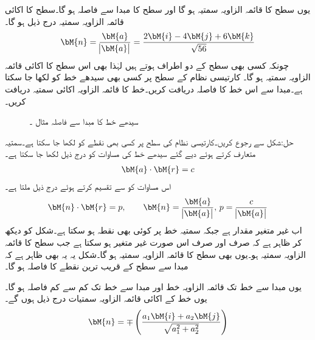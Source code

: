 یوں سطح  کا قائمہ الزاویہ سمتیہ  ہو گا اور سطح کا مبدا سے فاصلہ
  ہو گا۔سطح کا اکائی قائمہ الزاویہ سمتیہ درج ذیل ہو گا۔
\begin{align*}
\bM{n}=\frac{\bM{a}}{\abs{\bM{a}}}=\frac{2\bM{i}-4\bM{j}+6\bM{k}}{\sqrt{56}}
\end{align*}
چونکہ کسی بھی سطح کے دو اطراف ہوتے ہیں لہٰذا  بھی اس سطح کا اکائی قائمہ الزاویہ سمتیہ ہو گا۔
کارتیسی نظام کے  سطح پر کسی بھی سیدھے خط  کو  لکھا جا سکتا ہے۔مبدا سے اس خط کا فاصلہ دریافت کریں۔خط کا قائمہ الزاویہ اکائی سمتیہ دریافت کریں۔
\begin{figure}
\centering
{}
\caption{سیدھے خط کا مبدا سے فاصلہ مثال ۔}
\label{شکل_مثال_سمتیہ_مرکز_سے_فاصلہ}
\end{figure}

حل:شکل  سے رجوع کریں۔کارتیسی نظام کی  سطح پر کسی بھی نقطے کو  لکھا جا سکتا ہے۔سمتیہ  متعارف کرتے ہوئے دیے گئے سیدھے خط کی مساوات کو درج ذیل لکھا جا سکتا ہے۔
\begin{align*}
\bM{a}\cdot \bM{r}=c
\end{align*} 
اس مساوات کو  سے تقسیم کرتے ہوئے درج ذیل ملتا ہے۔
\begin{align*}
\bM{n}\cdot \bM{r}=p,\quad \quad \bM{n}=\frac{\bM{a}}{\abs{\bM{a}}},\, p=\frac{c}{\abs{\bM{a}}}
\end{align*}
اب  غیر متغیر مقدار ہے جبکہ سمتیہ  خط پر کوئی بھی نقطہ ہو سکتا ہے۔شکل کو دیکھ کر ظاہر ہے کہ  صرف اور صرف اس صورت غیر متغیر ہو سکتا ہے جب  سطح کا قائمہ الزاویہ سمتیہ ہو۔یوں  بھی سطح کا قائمہ الزاویہ سمتیہ ہو گا۔شکل یہ یہ بھی ظاہر ہے کہ مبدا سے سطح کے قریب ترین نقطے کا فاصلہ  ہو گا۔

یوں مبدا سے خط تک قائمہ الزاویہ خط  اور مبدا سے خط تک کم سے کم فاصلہ  ہو گا۔یوں خط کے اکائی قائمہ الزاویہ سمتیات درج ذیل ہوں گے۔
\begin{align*}
\bM{n}=\mp \left(\frac{a_1\bM{i}+a_2\bM{j}}{\sqrt{a_1^2+a_2^2}}\right)
\end{align*} 

